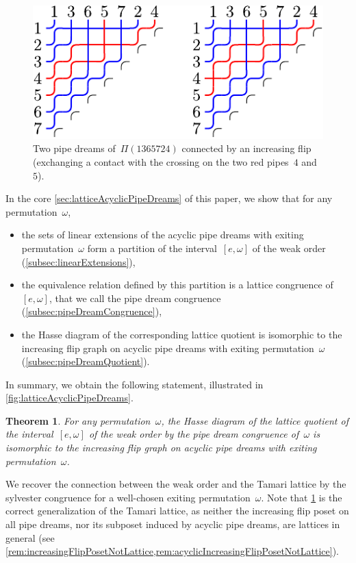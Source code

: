 \documentclass[reqno]{amsart}
\newtheorem{theoremA}{Theorem}
\theoremstyle{definition}
\newcommand{\pipeDreams}{\Pi} %
\begin{document}
\begin{figure}[t]
	\centerline{
		\includegraphics[scale=.9]{pipeDreams}
	}
	\caption{Two pipe dreams of~$\pipeDreams(1365724)$ connected by an increasing flip (exchanging a contact with the crossing on the two red pipes~$4$ and~$5$).}
	\label{fig:pipeDreams}
\end{figure}

In the core \cref{sec:latticeAcyclicPipeDreams} of this paper, we show that for any permutation~$\omega$,
\begin{itemize}
\item the sets of linear extensions of the acyclic pipe dreams with exiting permutation~$\omega$ form a partition of the interval~$[e,\omega]$ of the weak order (\cref{subsec:linearExtensions}),
\item the equivalence relation defined by this partition is a lattice congruence of~$[e, \omega]$, that we call the pipe dream congruence (\cref{subsec:pipeDreamCongruence}),
\item the Hasse diagram of the corresponding lattice quotient is isomorphic to the increasing flip graph on acyclic pipe dreams with exiting permutation~$\omega$ (\cref{subsec:pipeDreamQuotient}).
\end{itemize}
In summary, we obtain the following statement, illustrated in \cref{fig:latticeAcyclicPipeDreams}.

\begin{theoremA}
\label{thm:A}
For any permutation~$\omega$, the Hasse diagram of the lattice quotient of the interval~$[e,\omega]$ of the weak order by the pipe dream congruence of~$\omega$ is isomorphic to the increasing flip graph on acyclic pipe dreams with exiting permutation~$\omega$.
\end{theoremA}

We recover the connection between the weak order and the Tamari lattice by the sylvester congruence for a well-chosen exiting permutation~$\omega$.
Note that \cref{thm:A} is the correct generalization of the Tamari lattice, as neither the increasing flip poset on all pipe dreams, nor its subposet induced by acyclic pipe dreams, are lattices in general (see \cref{rem:increasingFlipPosetNotLattice,rem:acyclicIncreasingFlipPosetNotLattice}).
\end{document}
